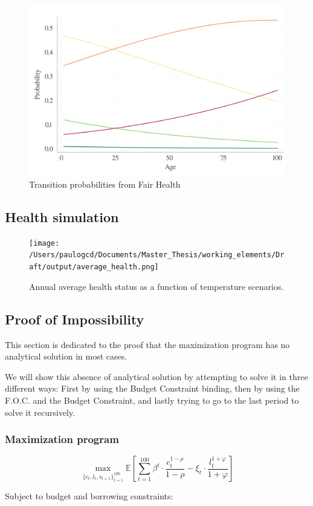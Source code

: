 \documentclass{article}
\begin{document}
\begin{figure}[H]\label{fig:health_transition_4}
    \begin{center}
        \includegraphics[width=0.4\linewidth]{output/health_transition_4.png}
        \caption{Transition probabilities from Fair Health}    
    \end{center}
\end{figure}

\subsection{Health simulation}

\begin{figure}[H]
    \texttt{[image: /Users/paulogcd/Documents/Master\_Thesis/working\_elements/Draft/output/average\_health.png]}
    \caption{Annual average health status as a function of temperature scenarios.}
\end{figure}

\subsection{Proof of Impossibility}

This section is dedicated to the proof that the maximization program
has no analytical solution in most cases.

We will show this absence of analytical solution by attempting to solve it in three different 
ways: First by using the Budget Constraint binding, then by using the F.O.C. and the Budget Constraint,
and lastly trying to go to the last period to solve it recursively. 

\subsubsection{Maximization program}

$$ \max_{\{c_{t},l_{t},s_{t+1}\}_{t=1}^{100}}
{\mathbb{E}\left[\sum_{t=1}^{100} \beta^{t}\cdot \frac{c_{t}^{1-\rho}}{1-\rho}-\xi_{t}\cdot \frac{l_{t}^{1+\varphi}}{1+\varphi}\right]}$$

Subject to budget and borrowing constraints:
\end{document}
